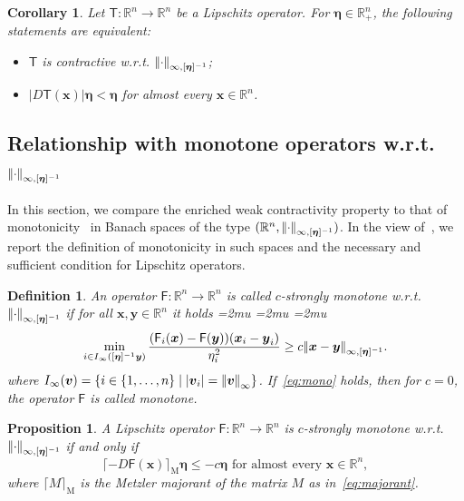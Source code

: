 \documentclass[journal,twoside,web]{ieeecolor}
\makeatletter
\newcommand{\mzr}[1]{\lceil#1\rceil_{\text{M}}}
\newcommand{\abs}[1]{{\left\vert #1 \right\vert}}
\newcommand{\norm}[1]{{\left\vert\kern-0.25ex\left\vert #1\right\vert\kern-0.25ex\right\vert}}
\renewcommand{\wp}[1]{\llbracket #1 \rrbracket}
\newcommand{\rea }{\mathbb{R}}
\newcommand{\xb}{\boldsymbol{x}}
\newcommand{\yb}{\boldsymbol{y}}
\newcommand{\vb}{\boldsymbol{v}}
\newcommand{\etab}{\boldsymbol{\eta}}
\newcommand{\Fs}{\mathsf{F}}
\newcommand{\Ts}{\mathsf{T}}
\newcommand{\diego}[1]{\color{red}{ @Diego: #1} \color{black}}
\newtheorem{prop}{Proposition}
\newtheorem{cor}{Corollary}
\newtheorem{defn}{Definition}
\makeatother
\begin{document}
\begin{cor}\label{cor:inf-conex2}
%
Let $\Ts:\rea^n\rightarrow\rea^n$ be a Lipschitz operator.
%
For $\etab\in\rea^n_+$, the following statements are equivalent:
%
\begin{itemize}
    \item[(i)] $\Ts$ is contractive w.r.t. $\norm{\cdot}_{\infty,[\etab]^{-1}}$;
    \item[(ii)] $\abs{D\Ts(\xb)}\etab < \etab$ for almost every $\xb\in\rea^n$.
\end{itemize}
\end{cor}






\subsection{Relationship with monotone operators w.r.t. $\norm{\cdot}_{\infty,[\etab]^{-1}}$}
%
In this section, we compare the enriched weak contractivity property to that of monotonicity~\cite[Definition 12.1]{rockafellar2009variational} in Banach spaces of the type $(\rea^n,\norm{\cdot}_{\infty,[\etab]^{-1}})$. In the view of~\cite{davydov2024non}, we report the definition of monotonicity in such spaces and the necessary and sufficient condition for Lipschitz operators.
%
\begin{defn}\label{def:mono}
%
\cite[Definition 12 and Equation (5)]{davydov2024non} An operator $\Fs:\rea^n\rightarrow\rea^n$ is called $c$-strongly monotone w.r.t. $\norm{\cdot}_{\infty,[\etab]^{-1}}$ if for all $\xb,\yb \in \rea^n$ it holds%
%
\begingroup
\medmuskip=2mu
\thinmuskip=2mu
\thickmuskip=2mu
\begin{equation}\label{eq:mono}
    \min_{i\in I_{\infty}([\etab]^{-1}\yb)}\frac{(\Fs_i(\xb)-\Fs(\yb))(\xb_i-\yb_i)}{\eta_i^2}\geq c\norm{\xb-\yb}_{\infty,[\etab]^{-1}}.
\end{equation}
\endgroup
%
where $I_{\infty}(\vb) = \{i\in\{1,\ldots,n\}\mid \abs{\vb_i}=\norm{\vb}_{\infty}\}$.
%
If~\eqref{eq:mono} holds, then for $c=0$, the operator $\Fs$ is called monotone.
%
\end{defn}
%
%
%
\begin{prop}\label{prop:monoc1}
%
\cite[Lemma 14]{davydov2024non} A Lipschitz operator ${\Fs:\mathbb{R}^n\rightarrow \mathbb{R}^n}$ is $c$-strongly monotone w.r.t. $\norm{\cdot}_{\infty,[\etab]^{-1}}$ if and only if
%
\begin{equation}\label{eq:mono_cond}
   \mzr{-D\Fs(\xb)}\etab \leq -c \etab
   \text{ for almost every } \xb \in \rea^n,
\end{equation}
%
where $\mzr{M}$ is the Metzler majorant of the matrix $M$ as in~\eqref{eq:majorant}.
%
\end{prop}
\end{document}
